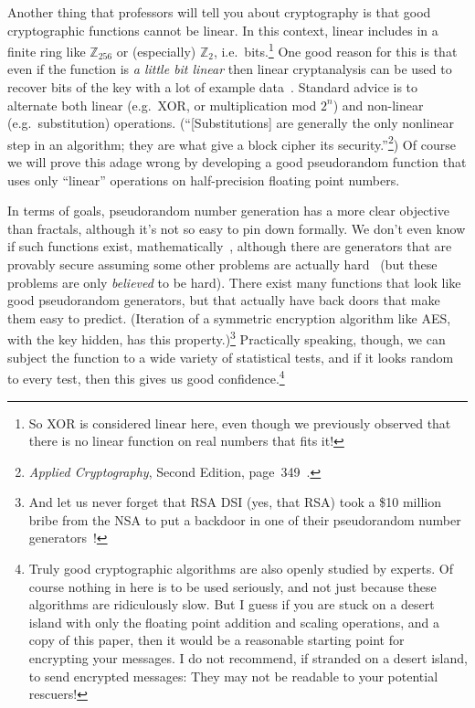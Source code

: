 \documentclass[twocolumn]{article}
\begin{document}
Another thing that professors will tell you about cryptography is that
good cryptographic functions cannot be linear. In this context, linear
includes in a finite ring like $\mathbb{Z}_{256}$ or (especially)
$\mathbb{Z}_{2}$, i.e.~bits.\footnote{So XOR is considered linear
  here, even though we previously observed that there is no linear
  function on real numbers that fits it!} One good reason for this is
that even if the function is {\em a little bit linear} then linear
cryptanalysis can be used to recover bits of the key with a lot of
example data~\cite{matsui1994linear}. Standard advice is to alternate
both linear (e.g.~XOR, or multiplication mod $2^n$) and non-linear
(e.g.~substitution) operations. (``[Substitutions] are generally the
only nonlinear step in an algorithm; they are what give a block cipher
its security.''\footnote{{\it Applied Cryptography}, Second Edition,
  page~349~\cite{schneier1996applied}.}) Of course we will prove this
adage wrong by developing a good pseudorandom function that uses only
``linear'' operations on half-precision floating point numbers.


In terms of goals, pseudorandom number generation has a more clear
objective than fractals, although it's not so easy to pin down
formally. We don't even know if such functions exist,
mathematically~\cite{haastad1999pseudorandom}, although there are
generators that are provably secure assuming some other problems are
actually hard~\cite{blum1986simple} (but these problems are only {\em
  believed} to be hard). There exist many functions that look like
good pseudorandom generators, but that actually have back doors that
make them easy to predict. (Iteration of a symmetric encryption
algorithm like AES, with the key hidden, has this
property.)\footnote{And let us never forget that RSA DSI (yes, that
  RSA) took a \$10 million bribe from the NSA to put a backdoor in one
  of their pseudorandom number generators~\cite{reuters2013secret}!}
Practically speaking, though, we can subject the function to a wide
variety of statistical tests, and if it looks random to every test,
then this gives us good confidence.\footnote{Truly good cryptographic
  algorithms are also openly studied by experts. Of course nothing in
  here is to be used seriously, and not just because these algorithms
  are ridiculously slow. But I guess if you are stuck on a desert
  island with only the floating point addition and scaling operations,
  and a copy of this paper, then it would be a reasonable starting
  point for encrypting your messages. I do not recommend, if stranded
  on a desert island, to send encrypted messages: They may not be
  readable to your potential rescuers!}
\end{document}
